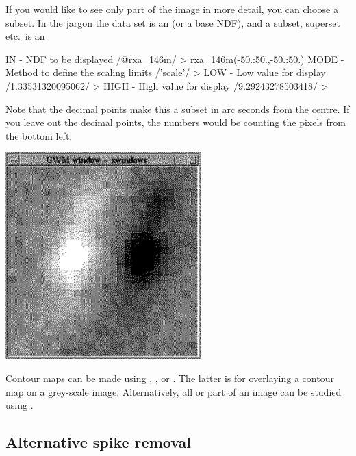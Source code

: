 \documentclass[11pt,noabs]{starlink}
\begin{document}
   If you would like to see only part of the image in more detail,
   you can choose a subset. In the jargon the data set is an
   (or a base NDF), and a subset, superset etc.\ is an

\begin{terminalv}
IN - NDF to be displayed /@rxa_146m/ > rxa_146m(-50.:50.,-50.:50.)
MODE - Method to define the scaling limits /'scale'/ >
LOW - Low value for display /1.33531320095062/ >
HIGH - High value for display /9.29243278503418/ >
\end{terminalv}

   Note that the decimal points make this a subset in arc seconds from
   the centre. If you leave out the decimal points, the numbers would be
   counting the pixels from the bottom left.

\begin{center}
\leavevmode\includegraphics[height=80mm]{sc1_display3}
\end{center}

   Contour maps can be made using
\texttt{},
\texttt{},
   or
\texttt{}.
   The latter is for overlaying a contour map on a grey-scale image.
   Alternatively, all or part of an image can be studied using
\texttt{}.

\subsection{\label{spikes2}Alternative spike removal}
\end{document}
